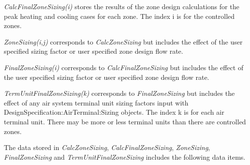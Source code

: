 \emph{CalcFinalZoneSizing(i)} stores the results of the zone design calculations for the peak heating and cooling cases for each zone. The index i is for the controlled zones.

\emph{ZoneSizing(i,j)} corresponds to \emph{CalcZoneSizing} but includes the effect of the user specified sizing factor or user specified zone design flow rate.

\emph{FinalZoneSizing(i)} corresponds to \emph{CalcFinalZoneSizing} but includes the effect of the user specified sizing factor or user specified zone design flow rate.

\emph{TermUnitFinalZoneSizing(k)} corresponds to \emph{FinalZoneSizing} but includes the effect of any air system terminal unit sizing factors input with DesignSpecification:AirTerminal:Sizing objects. The index k is for each air terminal unit. There may be more or less terminal units than there are controlled zones.

The data stored in \emph{CalcZoneSizing}, \emph{CalcFinalZoneSizing}, \emph{ZoneSizing}, \emph{FinalZoneSizing} and \emph{TermUnitFinalZoneSizing} includes the following data items.

